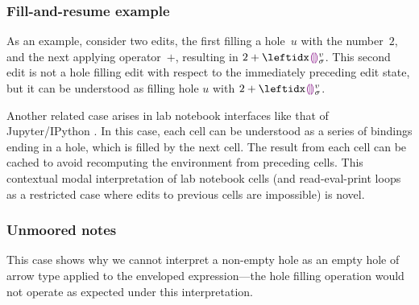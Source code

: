 \subsubsection{Fill-and-resume example}


As an example, consider two edits, the first filling a hole~$u$ with
the number~$2$, and the next applying operator~$+$, resulting in $2
+ \dehole{v}{\sigma}{}$.
%
This second edit is not a hole filling edit with respect to the
immediately preceding edit state, but it can be understood as filling
hole $u$ with $2 + \dehole{v}{\sigma}{}$. 



Another related case arises in lab notebook interfaces like that of
Jupyter/IPython \cite{PER-GRA:2007}.
%
In this case, each cell can be understood as a series of 
bindings ending in a hole, which is filled by the next cell.
%
The result from each cell can be cached to avoid recomputing the
environment from preceding cells. This contextual modal interpretation
of lab notebook cells (and read-eval-print loops as a restricted case
where edits to previous cells are impossible) is novel.

\subsubsection{Unmoored notes}


This case shows why we cannot interpret a non-empty hole as an empty
hole of arrow type applied to the enveloped expression---the hole
filling operation would not operate as expected under this
interpretation.
